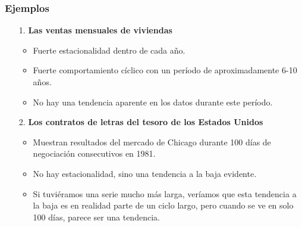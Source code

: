 \documentclass[10pt]{beamer}
\begin{document}
\begin{frame}[fragile]
\frametitle{Ejemplos}

\begin{enumerate}
\item[1.] \textbf{Las ventas mensuales de viviendas}

\begin{itemize}
\item Fuerte estacionalidad dentro de cada año. 
\item Fuerte comportamiento cíclico con un período de aproximadamente 6-10 años. 
\item No hay una tendencia aparente en los datos durante este período.
\end{itemize}

\pause
\vspace{3mm}

\item[2.] \textbf{Los contratos de letras del tesoro de los Estados Unidos} 

\begin{itemize}
\item Muestran resultados del mercado de Chicago durante 100 días de negociación consecutivos en 1981. 
\item No hay estacionalidad, sino una tendencia a la baja evidente. 
\item Si tuviéramos una serie mucho más larga, veríamos que esta tendencia a la baja es en realidad parte de un ciclo largo, pero cuando se ve en solo 100 días, parece ser una tendencia.
\end{itemize}


\end{enumerate}





\end{frame}


\end{document}
